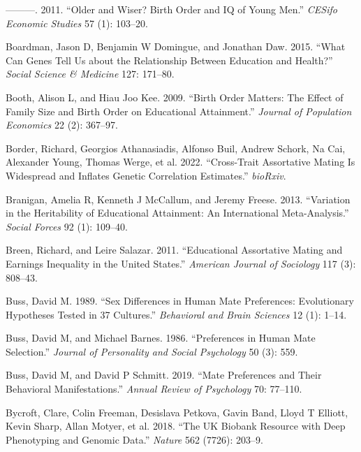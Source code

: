 \documentclass[
  12pt,
]{article}
\newlength{\cslhangindent}
\newlength{\cslentryspacingunit} %
\newenvironment{CSLReferences}[2] %
 {%
  \setlength{\parindent}{0pt}
  \ifodd #1
  \let\oldpar\par
  \def\par{\hangindent=\cslhangindent\oldpar}
  \fi
  \setlength{\parskip}{#2\cslentryspacingunit}
 }%
 {}
\theoremstyle{definition}
\theoremstyle{definition}
\theoremstyle{definition}
\theoremstyle{definition}
\theoremstyle{remark}
\begin{document}
\begin{CSLReferences}{1}{0}
\leavevmode{}%
---------. 2011. {``Older and Wiser? Birth Order and IQ of Young Men.''} \emph{CESifo Economic Studies} 57 (1): 103--20.

\leavevmode{}%
Boardman, Jason D, Benjamin W Domingue, and Jonathan Daw. 2015. {``What Can Genes Tell Us about the Relationship Between Education and Health?''} \emph{Social Science \& Medicine} 127: 171--80.

\leavevmode{}%
Booth, Alison L, and Hiau Joo Kee. 2009. {``Birth Order Matters: The Effect of Family Size and Birth Order on Educational Attainment.''} \emph{Journal of Population Economics} 22 (2): 367--97.

\leavevmode{}%
Border, Richard, Georgios Athanasiadis, Alfonso Buil, Andrew Schork, Na Cai, Alexander Young, Thomas Werge, et al. 2022. {``Cross-Trait Assortative Mating Is Widespread and Inflates Genetic Correlation Estimates.''} \emph{bioRxiv}.

\leavevmode{}%
Branigan, Amelia R, Kenneth J McCallum, and Jeremy Freese. 2013. {``Variation in the Heritability of Educational Attainment: An International Meta-Analysis.''} \emph{Social Forces} 92 (1): 109--40.

\leavevmode{}%
Breen, Richard, and Leire Salazar. 2011. {``Educational Assortative Mating and Earnings Inequality in the United States.''} \emph{American Journal of Sociology} 117 (3): 808--43.

\leavevmode{}%
Buss, David M. 1989. {``Sex Differences in Human Mate Preferences: Evolutionary Hypotheses Tested in 37 Cultures.''} \emph{Behavioral and Brain Sciences} 12 (1): 1--14.

\leavevmode{}%
Buss, David M, and Michael Barnes. 1986. {``Preferences in Human Mate Selection.''} \emph{Journal of Personality and Social Psychology} 50 (3): 559.

\leavevmode{}%
Buss, David M, and David P Schmitt. 2019. {``Mate Preferences and Their Behavioral Manifestations.''} \emph{Annual Review of Psychology} 70: 77--110.

\leavevmode{}%
Bycroft, Clare, Colin Freeman, Desislava Petkova, Gavin Band, Lloyd T Elliott, Kevin Sharp, Allan Motyer, et al. 2018. {``The UK Biobank Resource with Deep Phenotyping and Genomic Data.''} \emph{Nature} 562 (7726): 203--9.


\end{CSLReferences}
\end{document}
